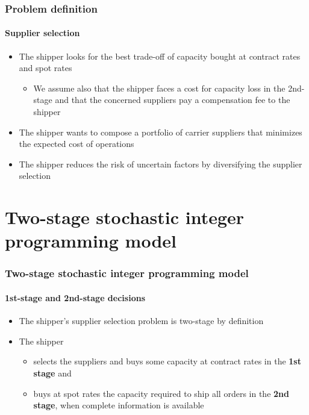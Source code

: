 \documentclass[9pt,xcolor={dvipsnames}]{beamer}
\begin{document}
\begin{frame}%
	\frametitle{Problem definition}
	\framesubtitle{Supplier selection}
	\begin{itemize}
		\item<1-> The shipper looks for the best trade-off of capacity bought at contract rates and spot rates
		\begin{itemize}
			\footnotesize
			\item<2-> We assume also that the shipper faces a cost for capacity loss in the 2nd-stage and that the concerned suppliers pay a compensation fee to the shipper
		\end{itemize}
		\bigskip
		\item<3-> The shipper wants to compose a portfolio of carrier suppliers that minimizes the expected cost of operations
		\bigskip
		\item<4-> The shipper reduces the risk of uncertain factors by diversifying the supplier selection
	\end{itemize}
\end{frame}

\section{Two-stage stochastic integer programming model}
\begin{frame}%
	\frametitle{Two-stage stochastic integer programming model}
	\framesubtitle{1st-stage and 2nd-stage decisions}
	\begin{itemize}
		\item<1-> The shipper's supplier selection problem is two-stage by definition
		\bigskip
		\item<2-> The shipper
		\bigskip
		\begin{itemize}
		\item<2-> selects the suppliers and buys some capacity at contract rates in the \textbf{1st stage} and
		\bigskip
		\item<3-> buys at spot rates the capacity required to ship all orders in the \textbf{2nd stage}, when complete information is available
		\end{itemize}
	\end{itemize}
\end{frame}
\end{document}
